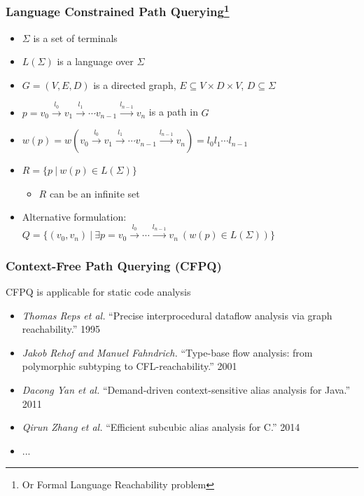 \documentclass[xcolor=table]{beamer}
\begin{document}
\begin{frame}[fragile]
  \frametitle{Language Constrained Path Querying\footnote{Or Formal Language Reachability problem}}
  \begin{itemize}
  \item $\Sigma$ is a set of terminals 
  \item $L(\Sigma)$ is a language over $\Sigma$
  \pause
  \item $G = (V,E,D)$ is a directed graph, $E \subseteq V\times D \times V$, $D\subseteq \Sigma$
  \pause
  \item $p = v_0 \xrightarrow{l_0} v_1 \xrightarrow{l_1} \cdots v_{n-1}\xrightarrow{l_{n-1}}v_n$ is a path in $G$
  \item $w(p) = w(v_0 \xrightarrow{l_0} v_1 \xrightarrow{l_1} \cdots v_{n-1}\xrightarrow{l_{n-1}}v_n) = l_0 l_1 \cdots l_{n-1}$
  \pause
  \item $R =\{ p \ | \ w(p) \in L(\Sigma)\}$
  \begin{itemize}
    \item $R$ can be an infinite set
  \end{itemize}
  \pause
  \item Alternative formulation: $Q =\{ (v_0,v_n) \ | \ \exists p = v_0 \xrightarrow{l_0} \cdots \xrightarrow{l_{n-1}}v_n \ (w(p) \in 
  L(\Sigma))\}$
  \end{itemize}
\end{frame}


\begin{frame} \frametitle{Context-Free Path Querying (CFPQ)}
  CFPQ is applicable for static code analysis %
  \bigskip
    \begin{itemize}
        \item \emph{Thomas Reps et al.} ``Precise interprocedural dataflow analysis via graph reachability.'' 1995 
        \item \emph{Jakob Rehof and Manuel Fahndrich.} ``Type-base flow analysis: from polymorphic subtyping to CFL-reachability.'' 2001
        \item \emph{Dacong Yan et al.} ``Demand-driven context-sensitive alias analysis for Java.'' 2011
        \item \emph{Qirun Zhang et al.}  ``Efficient subcubic alias analysis for C.'' 2014
        \item ...
    \end{itemize}
\end{frame}
\end{document}
